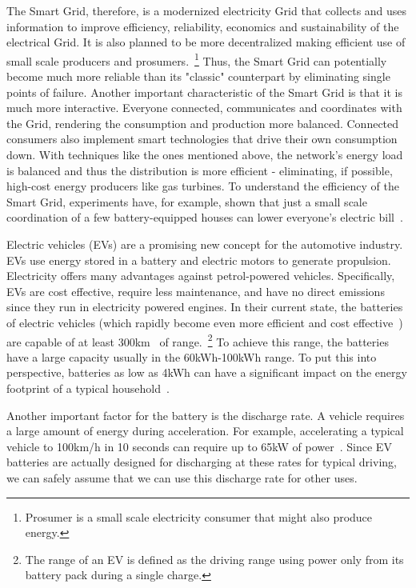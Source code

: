 The Smart Grid, therefore, is a modernized electricity Grid that collects and uses information to improve efficiency, reliability, economics and sustainability of the electrical Grid. It is also planned to be more decentralized making efficient use of small scale producers and prosumers.~\footnote{Prosumer is a small scale electricity consumer that might also produce energy\cite{lampropoulos2010methodology}.} Thus, the Smart Grid can potentially become much more reliable than its "classic" counterpart by eliminating single points of failure. Another important characteristic of the Smart Grid is that it is much more interactive. Everyone connected, communicates and coordinates with the Grid, rendering the consumption and production more balanced. Connected consumers also implement smart technologies that drive their own consumption down. With techniques like the ones mentioned above, the network's energy load is balanced and thus the distribution is more efficient - eliminating, if possible, high-cost energy producers like gas turbines. To understand the efficiency of the Smart Grid, experiments have, for example, shown that just a small scale coordination of a few battery-equipped houses can lower everyone's electric bill~\cite{vytelingum2010agent}.

Electric vehicles (EVs) are a promising new concept for the automotive industry. EVs use energy stored in a battery and electric motors to generate propulsion. Electricity offers many advantages against petrol-powered vehicles. Specifically, EVs are cost effective, require less maintenance, and have no direct emissions since they run in electricity powered engines. In their current state, the batteries of electric vehicles (which rapidly become even more efficient and cost effective~\cite{nykvist2015rapidly}) are capable of at least 300km~\cite{globalev2016}\cite{young2013electric} of range.~\footnote{The range of an EV is defined as the driving range using power only from its battery pack during a single charge.} To achieve this range, the batteries have a large capacity usually in the 60kWh-100kWh range. To put this into perspective, batteries as low as 4kWh can have a significant impact on the energy footprint of a typical household~\cite{vytelingum2010agent}.

Another important factor for the battery is the discharge rate. A vehicle requires a large amount of energy during acceleration. For example, accelerating a typical vehicle to 100km/h in 10 seconds can require up to 65kW of power~\cite{young2013electric}. Since EV batteries are actually designed for discharging at these rates for typical driving, we can safely assume that we can use this discharge rate for other uses.

